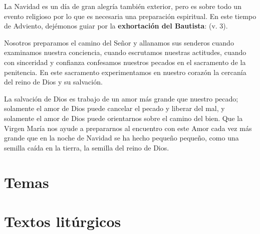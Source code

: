\begin{body}
	La Navidad es un día de gran alegría también exterior, pero es sobre todo un evento religioso por lo que es necesaria una preparación espiritual. En este tiempo de Adviento, dejémonos guiar por la \textbf{exhortación del Bautista}:  (v. 3).
	
	Nosotros preparamos el camino del Señor y allanamos sus senderos cuando examinamos nuestra conciencia, cuando escrutamos nuestras actitudes, cuando con sinceridad y confianza confesamos nuestros pecados en el sacramento de la penitencia. En este sacramento experimentamos en nuestro corazón la cercanía del reino de Dios y su salvación.
	
	La salvación de Dios es trabajo de un amor más grande que nuestro pecado; solamente el amor de Dios puede cancelar el pecado y liberar del mal, y solamente el amor de Dios puede orientarnos sobre el camino del bien. Que la Virgen María nos ayude a prepararnos al encuentro con este Amor cada vez más grande que en la noche de Navidad se ha hecho pequeño pequeño, como una semilla caída en la tierra, la semilla del reino de Dios.
\end{body}

\newsection

\section{Temas}



\newsection
\section{Textos litúrgicos}

